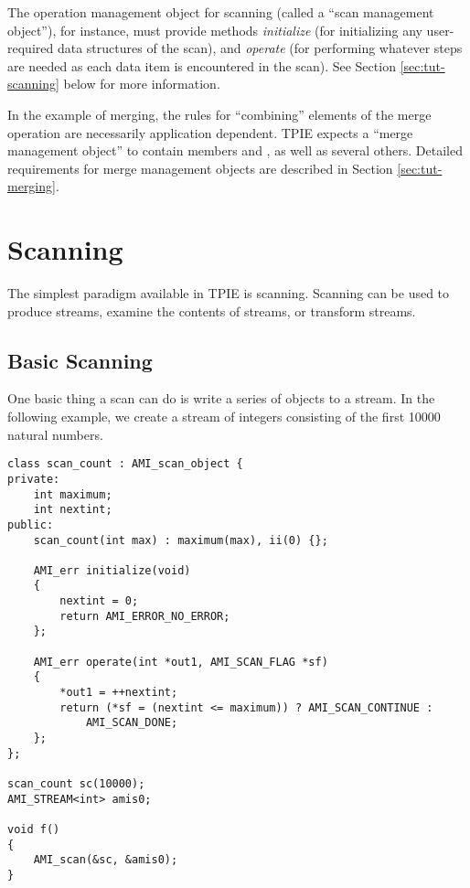 The operation management object for scanning (called a
``scan management object''), for instance, must provide methods {\em
   initialize} (for initializing any user-required data
structures of the scan), and {\em operate} (for performing
whatever steps are needed as each data item is encountered
in the scan). See Section \ref{sec:tut-scanning} below for more
information.

In the example of merging, the rules for ``combining''
elements of the merge operation are necessarily application
dependent. TPIE expects a ``merge management
object'' to contain
members  and , as well as
several others. Detailed requirements for merge management
objects are described in Section \ref{sec:tut-merging}.

\section{Scanning}

 
The simplest paradigm available in TPIE is scanning.  Scanning can be
used to produce streams, examine the contents of streams, or transform
streams.  

\subsection{Basic Scanning}

One basic thing a scan can do is write a series of
objects to a stream.  In the following example, we create a
stream of integers consisting of the first 10000 natural
numbers.  

\begin{verbatim}
class scan_count : AMI_scan_object {
private:
    int maximum;
    int nextint;
public:
    scan_count(int max) : maximum(max), ii(0) {};

    AMI_err initialize(void) 
    {
        nextint = 0;
        return AMI_ERROR_NO_ERROR;
    };

    AMI_err operate(int *out1, AMI_SCAN_FLAG *sf)
    {
        *out1 = ++nextint;
        return (*sf = (nextint <= maximum)) ? AMI_SCAN_CONTINUE : 
            AMI_SCAN_DONE;
    };
};

scan_count sc(10000);
AMI_STREAM<int> amis0;    

void f()
{
    AMI_scan(&sc, &amis0);
}
\end{verbatim}

